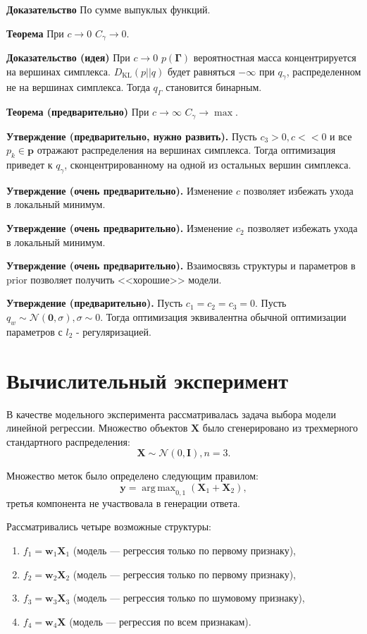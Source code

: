 \documentclass[12pt]{article}
\DeclareMathOperator*{\argmax}{arg\,max}
\begin{document}
\textbf{Доказательство} По сумме выпуклых функций.

 
\textbf{Теорема} При $c \to 0$ $C_\gamma \to 0$.

\textbf{Доказательство (идея)} При $c \to 0$ $p(\boldsymbol{\Gamma})$ вероятностная масса концентрируется на вершинах симплекса. $D_\text{KL} (p||q)$ будет равняться $-\infty$ при $q_\gamma$, распределенном не на вершинах симплекса. Тогда $q_\Gamma$ становится бинарным. 


\textbf{Теорема (предварительно)} При $c \to \infty$ $C_\gamma \to \max$.

\textbf{Утверждение (предварительно, нужно развить).} Пусть $c_3 > 0, c << 0$ и все $p_k \in \mathbf{p}$ отражают распределения на вершинах симплекса. Тогда оптимизация приведет к $q_\gamma$, сконцентрированному на одной из остальных вершин симплекса.

\textbf{Утверждение (очень предварительно).} Изменение $c$ позволяет избежать ухода в локальный минимум. 

\textbf{Утверждение (очень предварительно).} Изменение $c_2$ позволяет избежать ухода в локальный минимум.

\textbf{Утверждение (очень предварительно).} Взаимосвязь структуры и параметров в prior позволяет получить <<хорошие>> модели.

\textbf{Утверждение (предварительно).} Пусть $c_1 = c_2 = c_3 = 0$. Пусть $q_w \sim \mathcal{N}(\mathbf{0}, \sigma), \sigma \sim 0$. 
Тогда оптимизация эквивалентна обычной оптимизации параметров с $l_2$ - регуляризацией.


\section{Вычислительный эксперимент}
В качестве модельного эксперимента рассматривалась задача выбора модели линейной регрессии.
Множество объектов $\mathbf{X}$ было сгенерировано из трехмерного стандартного распределения: 
\[
    \mathbf{X} \sim \mathcal{N}(0, \mathbf{I}), n = 3.
\]

Множество меток было определено следующим правилом:
\[
    \mathbf{y}= \argmax_{0,1} (\mathbf{X}_1 + \mathbf{X}_2),
\]
третья компонента не участвовала в генерации ответа.

Рассматривались четыре возможные структуры:
\begin{enumerate}
\item $f_1 = \mathbf{w}_1 \mathbf{X}_1$ (модель --- регрессия только по первому признаку), 

\item $f_2 = \mathbf{w}_2 \mathbf{X}_2$ (модель --- регрессия только по первому признаку), 

\item $f_3 = \mathbf{w}_3 \mathbf{X}_3$ (модель --- регрессия только по шумовому признаку), 

\item $f_4 = \mathbf{w}_4 \mathbf{X}$ (модель --- регрессия по всем признакам). 
\end{enumerate}
\end{document}
